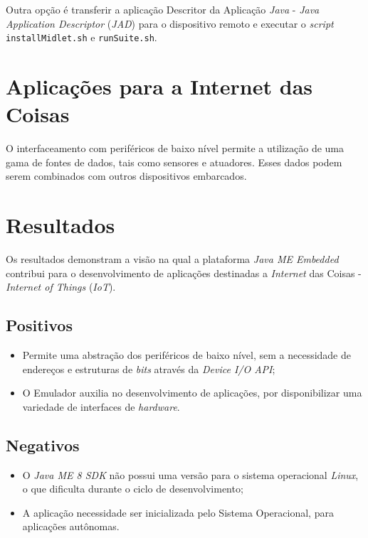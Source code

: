 Outra opção é transferir a aplicação Descritor da Aplicação \textit{Java} -
\textit{Java Application Descriptor} (\textit{JAD}) para o dispositivo remoto e
executar o \textit{script} \verb|installMidlet.sh| e \verb|runSuite.sh|.

\section{Aplicações para a Internet das Coisas}

O interfaceamento com periféricos de baixo nível permite a utilização de uma
gama de fontes de dados, tais como sensores e atuadores. Esses dados podem
serem combinados com outros dispositivos embarcados.

\section{Resultados}

Os resultados demonstram a visão na qual a plataforma \textit{Java ME Embedded}
contribui para o desenvolvimento de aplicações destinadas a \textit{Internet}
das Coisas - \textit{Internet of Things} (\textit{IoT}).

\subsection{Positivos}

\begin{itemize}

    \item Permite uma abstração dos periféricos de baixo nível, sem a
    necessidade de endereços e estruturas de \textit{bits} através da
    \textit{Device I/O API};

    \item O Emulador auxilia no desenvolvimento de aplicações, por
    disponibilizar uma variedade de interfaces de \textit{hardware}.

\end{itemize}

\subsection{Negativos}

\begin{itemize}

    \item O \textit{Java ME 8 SDK} não possui uma versão para o sistema
    operacional \textit{Linux}, o que dificulta durante o ciclo de
    desenvolvimento;

    \item A aplicação necessidade ser inicializada pelo Sistema Operacional,
    para aplicações autônomas.

\end{itemize}
